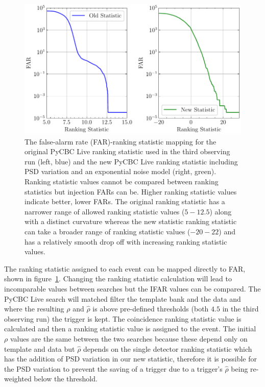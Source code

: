 \begin{figure}
      \centering
    \includegraphics[width=1.0\textwidth]{images/5_pycbclive/fits-psd/fits_psd_far_vs_stat.pdf}
    \caption{The false-alarm rate (FAR)-ranking statistic mapping for the original PyCBC Live ranking statistic used in the third observing run (left, blue) and the new PyCBC Live ranking statistic including PSD variation and an exponential noise model (right, green). Ranking statistic values cannot be compared between ranking statistics but injection FARs can be. Higher ranking statistic values indicate better, lower FARs. The original ranking statistic has a narrower range of allowed ranking statistic values ($5 - 12.5$) along with a distinct curvature whereas the new statistic ranking statistic can take a broader range of ranking statistic values ($-20-22$) and has a relatively smooth drop off with increasing ranking statistic values.}
    \label{5:fig:fits-psdvar-far-stat}
\end{figure}
%
The ranking statistic assigned to each event can be mapped directly to FAR, shown in figure~\ref{5:fig:fits-psdvar-far-stat}. Changing the ranking statistic calculation will lead to incomparable values between searches but the IFAR values can be compared. The PyCBC Live search will matched filter the template bank and the data and where the resulting $\rho$ and $\hat{\rho}$ is above pre-defined thresholds (both $4.5$ in the third observing run) the trigger is kept. The coincidence ranking statistic value is calculated and then a ranking statistic value is assigned to the event. The initial $\rho$ values are the same between the two searches because these depend only on template and data but $\hat{\rho}$ depends on the single detector ranking statistic which has the addition of PSD variation in our new statistic, therefore it is possible for the PSD variation to prevent the saving of a trigger due to a trigger's $\hat{\rho}$ being re-weighted below the threshold.

